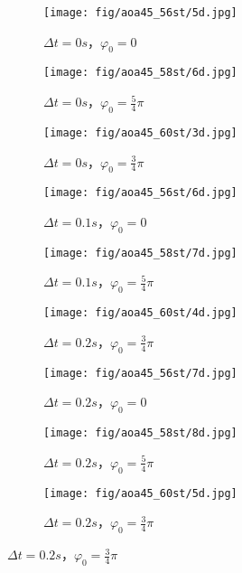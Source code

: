 \begin{figure}[!htp]
  \centering

  \begin{subfigure}{0.25\textwidth}
    \centering
    \texttt{[image: fig/aoa45\_56st/5d.jpg]}
    \caption{$\Delta t = 0s$，$\varphi_0 = 0$}
  \end{subfigure}
  \hspace{1cm}
  \begin{subfigure}{0.25\textwidth}
    \centering
    \texttt{[image: fig/aoa45\_58st/6d.jpg]}
    \caption{$\Delta t = 0s$，$\varphi_0 = \frac 5 4 \pi$}
  \end{subfigure}
  \hspace{1cm}
  \begin{subfigure}{0.25\textwidth}
    \centering
    \texttt{[image: fig/aoa45\_60st/3d.jpg]}
    \caption{$\Delta t = 0s$，$\varphi_0 = \frac 3 4 \pi$}
  \end{subfigure}

  \quad

  \begin{subfigure}{0.25\textwidth}
    \centering
    \texttt{[image: fig/aoa45\_56st/6d.jpg]}
    \caption{$\Delta t = 0.1s$，$\varphi_0 = 0$}
  \end{subfigure}
  \hspace{1cm}
  \begin{subfigure}{0.25\textwidth}
    \centering
    \texttt{[image: fig/aoa45\_58st/7d.jpg]}
    \caption{$\Delta t = 0.1s$，$\varphi_0 = \frac 5 4 \pi$}
  \end{subfigure}
  \hspace{1cm}
  \begin{subfigure}{0.25\textwidth}
    \centering
    \texttt{[image: fig/aoa45\_60st/4d.jpg]}
    \caption{$\Delta t = 0.2s$，$\varphi_0 = \frac 3 4 \pi$}
  \end{subfigure}

  \quad 
  \begin{subfigure}{0.25\textwidth}
    \centering
    \texttt{[image: fig/aoa45\_56st/7d.jpg]}
    \caption{$\Delta t = 0.2s$，$\varphi_0 = 0$}
  \end{subfigure}
  \hspace{1cm}
  \begin{subfigure}{0.25\textwidth}
  \centering
  \texttt{[image: fig/aoa45\_58st/8d.jpg]}
  \caption{$\Delta t = 0.2s$，$\varphi_0 = \frac 5 4 \pi$}
  \end{subfigure}
  \hspace{1cm}
  \begin{subfigure}{0.25\textwidth}
  \centering
  \texttt{[image: fig/aoa45\_60st/5d.jpg]}
  \caption{$\Delta t = 0.2s$，$\varphi_0 = \frac 3 4 \pi$}
  \end{subfigure}


\end{figure}
